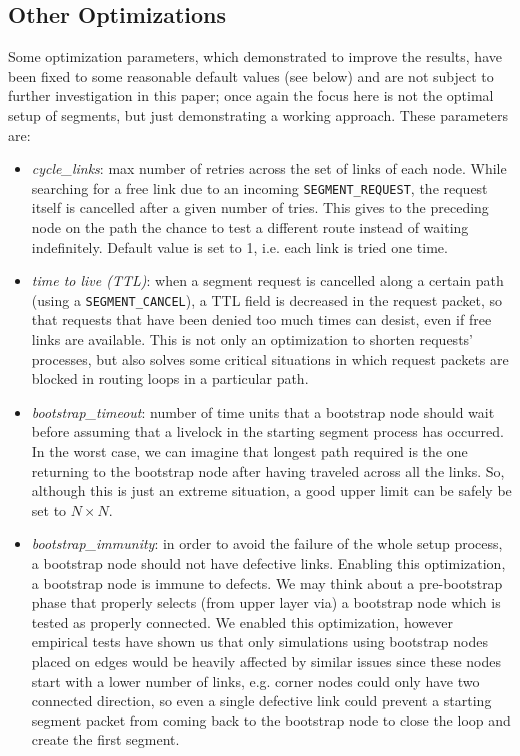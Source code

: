 \subsection{Other Optimizations}
Some optimization parameters, which demonstrated to improve the \disr{}
results, have been fixed to some reasonable default values (see below) and are not subject to
further investigation in this paper; once again the focus here is not the
optimal setup of segments, but just demonstrating a working approach. 
These parameters are:
\begin{itemize}
\item \emph{cycle\_links}: max number of retries across the set of links of
each node. While searching for a free link due to an incoming \texttt{SEGMENT\_REQUEST},
the request itself is cancelled after a given number of tries. This
gives to the preceding node on the path the
chance to test a different route instead of waiting indefinitely.
Default value is set to 1, i.e. each link is tried one time.
\item \emph{time to live (TTL)}: when a segment request is cancelled
along a certain path (using a \texttt{SEGMENT\_CANCEL}), a TTL field is
decreased in the request packet, so that requests that have been
denied too much times can desist, even if free links are
available. This is not only an optimization to shorten
requests' processes, but also solves some critical situations in which
request packets are blocked in routing loops in a particular path.
\item \emph{bootstrap\_timeout}: number of time units that a bootstrap node
should wait before assuming that a livelock in the starting segment
process has occurred. In the worst case, we can imagine that longest
path required is the one returning to the bootstrap node after having
traveled across all the links. So, although this is just an extreme
situation, a good upper limit can be safely be set to $N \times N$.
\item \emph{bootstrap\_immunity}: in order to avoid the failure of the whole \disr{}
setup process, a bootstrap node should not have defective links.
Enabling this optimization, a bootstrap node is immune to defects.
We may think about a pre-bootstrap phase that properly selects (from upper
layer via) a bootstrap node which is tested as properly connected. We
enabled this optimization, however empirical tests have shown us that only
simulations using bootstrap nodes placed on edges would be heavily
affected by similar issues since these nodes start with a lower number of links,
e.g. corner nodes could only have two connected direction, so even a single
defective link could prevent a starting segment packet from coming back to the
bootstrap node to close the loop and create the first segment.
\end{itemize}
